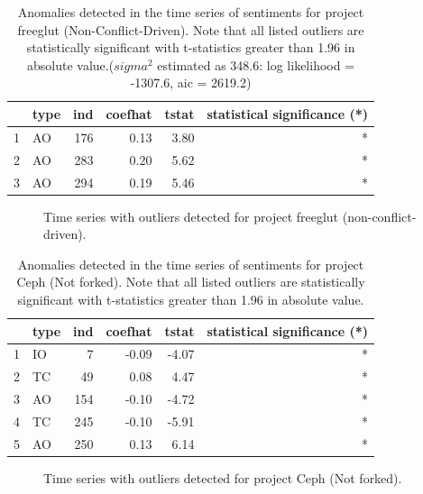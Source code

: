 \documentclass[12pt,letterpaper]{gthesis2}  %
\begin{document}
\begin{table} [!htbp]
\centering
\caption{Anomalies detected in the time series of sentiments for project freeglut (Non-Conflict-Driven). Note that all listed outliers are statistically significant with t-statistics greater than 1.96 in absolute value.($sigma^2$ estimated as 348.6:  log likelihood = -1307.6,  aic = 2619.2)}
\begin{tabular}{rlrrrr}
  \hline
 & type & ind & coefhat & tstat & statistical significance (*)\\ 
  \hline
1 & AO & 176 & 0.13 & 3.80  & *\\ 
  2 & AO & 283 & 0.20 & 5.62  & *\\ 
  3 & AO & 294 & 0.19 & 5.46  & *\\ 
   \hline
\end{tabular}
\end{table}

\begin{figure} [!htbp]
\centering
{}
\caption{Time series with outliers detected for project freeglut (non-conflict-driven).}
\label{figureOutliers_9}
\end{figure}

\pagebreak


\begin{table} [!htbp]
\centering
\caption{Anomalies detected in the time series of sentiments for project Ceph (Not forked). Note that all listed outliers are statistically significant with t-statistics greater than 1.96 in absolute value.}
\begin{tabular}{rlrrrr}
  \hline
 & type & ind & coefhat & tstat & statistical significance (*) \\ 
  \hline
1 & IO &   7 & -0.09 & -4.07 & * \\ 
  2 & TC &  49 & 0.08 & 4.47 & * \\ 
  3 & AO & 154 & -0.10 & -4.72  & *\\ 
  4 & TC & 245 & -0.10 & -5.91 & * \\ 
  5 & AO & 250 & 0.13 & 6.14  & *\\ 
   \hline
\end{tabular}
\end{table}

\begin{figure}
\centering
{}
\caption{Time series with outliers detected for project Ceph (Not forked).}
\label{figureOutliers_10}
\end{figure}
\end{document}
